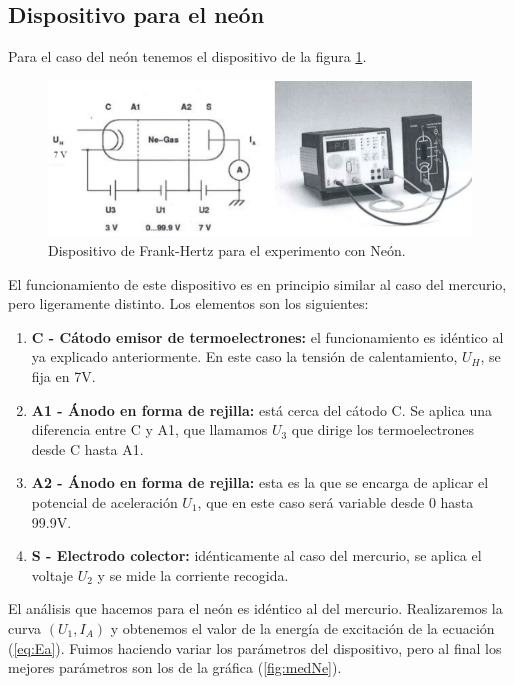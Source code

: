 \documentclass{article}
\begin{document}
\subsection{Dispositivo para el neón}

Para el caso del neón tenemos el dispositivo de la figura \ref{fig:FHNe}.

\begin{figure}[h!]
\begin{center}
\includegraphics[max width=\linewidth]{FHNe}
\caption{Dispositivo de Frank-Hertz para el experimento con Neón.}
\label{fig:FHNe}
\end{center}
\end{figure}

El funcionamiento de este dispositivo es en principio similar al caso del mercurio, pero ligeramente distinto. Los elementos son los siguientes:

\begin{enumerate}
\item \textbf{C - Cátodo emisor de termoelectrones:} el funcionamiento es idéntico al ya explicado anteriormente. En este caso la tensión de calentamiento, $U_H$, se fija en 7V.
\item \textbf{A1 - Ánodo en forma de rejilla:} está cerca del cátodo C. Se aplica una diferencia entre C y A1, que llamamos $U_3$ que dirige los termoelectrones desde C hasta A1.
\item \textbf{A2 - Ánodo en forma de rejilla:} esta es la que se encarga de aplicar el potencial de aceleración $U_1$, que en este caso será variable desde 0 hasta 99.9V.
\item \textbf{S - Electrodo colector:} idénticamente al caso del mercurio, se aplica el voltaje $U_2$  y se mide la corriente recogida.
\end{enumerate}

El análisis que hacemos para el neón es idéntico al del mercurio. Realizaremos la curva $(U_1, I_A)$ y obtenemos el valor de la energía de excitación de la ecuación (\ref{eq:Ea}). Fuimos haciendo variar los parámetros del dispositivo, pero al final los mejores parámetros son los de la gráfica (\ref{fig:medNe}).
\end{document}
